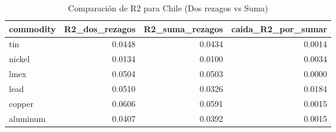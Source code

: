 \begin{table}
\caption{Comparación de R2 para Chile (Dos rezagos vs Suma)}
\label{tab:comp_chile}
\begin{tabular}{lrrr}
\toprule
commodity & R2_dos_rezagos & R2_suma_rezagos & caida_R2_por_sumar \\
\midrule
tin & 0.0448 & 0.0434 & 0.0014 \\
nickel & 0.0134 & 0.0100 & 0.0034 \\
lmex & 0.0504 & 0.0503 & 0.0000 \\
lead & 0.0510 & 0.0326 & 0.0184 \\
copper & 0.0606 & 0.0591 & 0.0015 \\
aluminum & 0.0407 & 0.0392 & 0.0015 \\
\bottomrule
\end{tabular}
\end{table}
